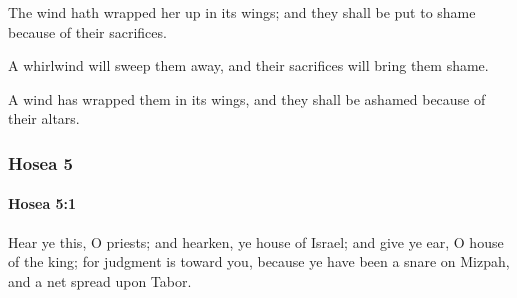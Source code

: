 			\begin{versebox}
					\item[BHS] 
					\item[LXX] 
					\item[ASV] The wind hath wrapped her up in its wings; and they shall be put to shame because of their sacrifices.
					\item[NIV] A whirlwind will sweep them away, and their sacrifices will bring them shame.
					\item[NRSV] A wind has wrapped them in its wings, and they shall be ashamed because of their altars.
			\end{versebox}
	\subsubsection{Hosea 5} %
		\label{HOSEA-5}

		\paragraph{Hosea 5:1} %
			\label{HOSEA-5-1}

			Hear ye this, O priests; and hearken, ye house of Israel; and give ye ear, O house of the king; for judgment is toward you, because ye have been a snare on Mizpah, and a net spread upon Tabor.

